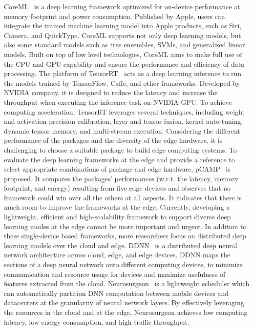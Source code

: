 CoreML~ is a deep learning framework optimized for on-device performance at memory footprint and power consumption. Published by Apple, users can integrate the trained machine learning model into Apple products, such as Siri, Camera, and QuickType. CoreML supports not only deep learning models, but also some standard models such as tree ensembles, SVMs, and generalized linear models. Built on top of low level technologies, CoreML aims to make full use of the CPU and GPU capability and ensure the performance and efficiency of data processing.
The platform of TensorRT~ acts as a deep learning inference to run the models trained by TensorFlow, Caffe, and other frameworks. Developed by NVIDIA company, it is designed to reduce the latency and increase the throughput when executing the inference task on NVIDIA GPU. To achieve computing acceleration, TensorRT leverages several techniques, including weight and activation precision calibration, layer and tensor fusion, kernel auto-tuning, dynamic tensor memory, and multi-stream execution.
Considering the different performance of the packages and the diversity of the edge hardware, it is challenging to choose a suitable package to build edge computing systems. To evaluate the deep learning frameworks at the edge and provide a reference to select appropriate combinations of package and edge hardware, pCAMP~ is proposed. It compares the packages' performances (w.r.t. the latency, memory footprint, and energy) resulting from five edge devices and observes that no framework could win over all the others at all aspects.
It indicates that there is much room to improve the frameworks at the edge. Currently, developing a lightweight, efficient and high-scalability framework to support diverse deep learning modes at the edge cannot be more important and urgent.
In addition to these single-device based frameworks, more researchers focus on distributed deep learning models over the cloud and edge. DDNN~ is a distributed deep neural network architecture across cloud, edge, and edge devices. DDNN maps the sections of a deep neural network onto different computing devices, to minimize communication and resource usage for devices and maximize usefulness of features extracted from the cloud. 
Neurosurgeon~ is a lightweight scheduler which can automatically partition DNN computation between mobile devices and datacenters at the granularity of neural network layers. By effectively leveraging the resources in the cloud and at the edge, Neurosurgeon achieves low computing latency, low energy consumption, and high traffic throughput. 
